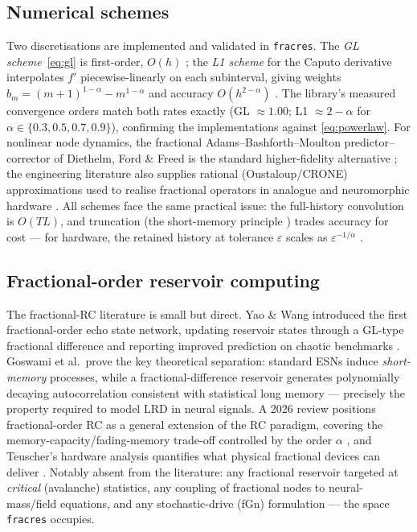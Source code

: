 \documentclass[11pt,a4paper]{article}
\begin{document}
\subsection{Numerical schemes}

Two discretisations are implemented and validated in \texttt{fracres}. The
\emph{GL scheme}~\eqref{eq:gl} is first-order, $O(h)$
\cite{oldham1974fractional,scherer2011grunwald}; the \emph{L1 scheme} for the
Caputo derivative interpolates $f'$ piecewise-linearly on each subinterval,
giving weights $b_m = (m+1)^{1-\alpha} - m^{1-\alpha}$ and accuracy
$O(h^{2-\alpha})$ \cite{linxu2007l1}. The library's measured convergence
orders match both rates exactly (GL $\approx 1.00$; L1 $\approx 2-\alpha$ for
$\alpha \in \{0.3, 0.5, 0.7, 0.9\}$), confirming the implementations against
\eqref{eq:powerlaw}. For nonlinear node dynamics, the fractional
Adams--Bashforth--Moulton predictor--corrector of Diethelm, Ford \& Freed is
the standard higher-fidelity alternative \cite{diethelm2002predictor}; the
engineering literature also supplies rational (Oustaloup/CRONE) approximations
used to realise fractional operators in analogue and neuromorphic hardware
\cite{monje2010fractional,podlubny1999controllers}. All schemes face the same
practical issue: the full-history convolution is $O(TL)$, and truncation (the
short-memory principle \cite{scherer2011grunwald}) trades accuracy for cost
--- for hardware, the retained history at tolerance $\varepsilon$ scales as
$\varepsilon^{-1/\alpha}$ \cite{teuscher2026hardware}.

\subsection{Fractional-order reservoir computing}

The fractional-RC literature is small but direct. Yao \& Wang introduced the
first fractional-order echo state network, updating reservoir states through a
GL-type fractional difference and reporting improved prediction on chaotic
benchmarks \cite{yao2020fractional}. Goswami et al.\ prove the key theoretical
separation: standard ESNs induce \emph{short-memory} processes, while a
fractional-difference reservoir generates polynomially decaying autocorrelation
consistent with statistical long memory \cite{goswami2026longmemory} ---
precisely the property required to model LRD in neural signals. A 2026 review
positions fractional-order RC as a general extension of the RC paradigm,
covering the memory-capacity/fading-memory trade-off controlled by the order
$\alpha$ \cite{mastin2026fractional}, and Teuscher's hardware analysis
quantifies what physical fractional devices can deliver
\cite{teuscher2026hardware}. Notably absent from the literature: any
fractional reservoir targeted at \emph{critical} (avalanche) statistics, any
coupling of fractional nodes to neural-mass/field equations, and any
stochastic-drive (fGn) formulation --- the space \texttt{fracres} occupies.
\end{document}
